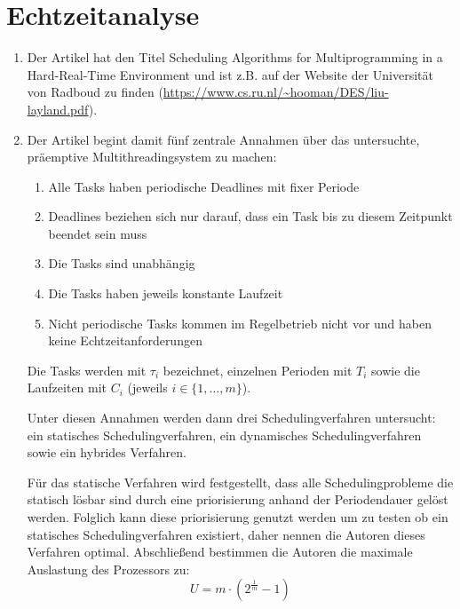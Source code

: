 \documentclass[DIN, pagenumber=false, fontsize=11pt, parskip=half]{scrartcl}
\begin{document}
    \section{Echtzeitanalyse}
    \begin{enumerate}[label=\alph*)]
        \item Der Artikel hat den Titel \glqq{}Scheduling Algorithms for Multiprogramming 
            in a Hard-Real-Time Environment\grqq{} und ist z.B. auf der Website der
            Universität von Radboud zu finden (\url{https://www.cs.ru.nl/~hooman/DES/liu-layland.pdf}).
        \item Der Artikel begint damit fünf zentrale Annahmen über das untersuchte,
            präemptive Multithreadingsystem zu machen:
            \begin{enumerate}
                \item Alle Tasks haben periodische Deadlines mit fixer Periode
                \item Deadlines beziehen sich nur darauf, dass ein Task bis zu diesem
                    Zeitpunkt beendet sein muss
                \item Die Tasks sind unabhängig
                \item Die Tasks haben jeweils konstante Laufzeit
                \item Nicht periodische Tasks kommen im Regelbetrieb nicht vor und
                    haben keine Echtzeitanforderungen
            \end{enumerate}
            Die Tasks werden mit $\tau_i$ bezeichnet, einzelnen Perioden mit 
            $T_i$ sowie die Laufzeiten mit $C_i$ (jeweils $i \in \{1, \ldots, m\}$).

            Unter diesen Annahmen werden dann drei Schedulingverfahren untersucht: ein
            statisches Schedulingverfahren, ein dynamisches Schedulingverfahren sowie
            ein hybrides Verfahren.

            Für das statische Verfahren wird festgestellt, dass alle Schedulingprobleme
            die statisch lösbar sind durch eine priorisierung anhand der Periodendauer
            gelöst werden. Folglich kann diese priorisierung genutzt werden um zu testen
            ob ein statisches Schedulingverfahren existiert, daher nennen die Autoren
            dieses Verfahren optimal. Abschließend bestimmen die Autoren die maximale
            Auslastung des Prozessors zu:
            \begin{equation}
                U = m \cdot \left(2^{\frac{1}{m}} -1 \right)
            \end{equation}


\end{enumerate}
\end{document}
